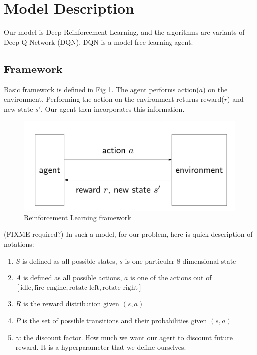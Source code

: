 \section{Model Description}
\label{sec:Model}

Our model is Deep Reinforcement Learning, and the algorithms are variants of Deep Q-Network (DQN). DQN is a model-free learning agent.

\subsection{Framework}
Basic framework is defined in Fig 1. The agent performs action($a$) on the environment. Performing the action on the environment returns reward($r$) and new state $s'$. Our agent then incorporates this information.

\begin{figure}%
\centering
\includegraphics[scale=0.3]{reinforcement_framework.png}%
\caption{Reinforcement Learning framework}%
\label{fig:datastats}%
\end{figure}

(FIXME required?)
In such a model, for our problem, here is quick description of notations:
\begin{enumerate}
\item $S$ is defined as all possible states, $s$ is one particular 8 dimensional state
\item $A$ is defined as all possible actions, $a$ is one of the actions out of $[\text{idle}, \text{fire engine}, \text{rotate left}, \text{rotate right}]$
\item $R$ is the reward distribution given $(s, a)$
\item $P$ is the set of possible transitions and their probabilities given $(s, a)$
\item $\gamma$: the discount factor. How much we want our agent to discount future reward. It is a hyperparameter that we define ourselves.
\end{enumerate}

